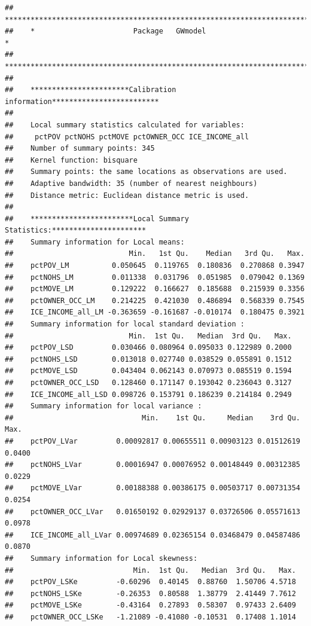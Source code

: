 \documentclass[
]{book}
\begin{document}
\begin{verbatim}
##    ***********************************************************************
##    *                       Package   GWmodel                             *
##    ***********************************************************************
## 
##    ***********************Calibration information*************************
## 
##    Local summary statistics calculated for variables:
##     pctPOV pctNOHS pctMOVE pctOWNER_OCC ICE_INCOME_all
##    Number of summary points: 345
##    Kernel function: bisquare 
##    Summary points: the same locations as observations are used.
##    Adaptive bandwidth: 35 (number of nearest neighbours)
##    Distance metric: Euclidean distance metric is used.
## 
##    ************************Local Summary Statistics:**********************
##    Summary information for Local means:
##                           Min.   1st Qu.    Median   3rd Qu.   Max.
##    pctPOV_LM          0.050645  0.119765  0.180836  0.270868 0.3947
##    pctNOHS_LM         0.011338  0.031796  0.051985  0.079042 0.1369
##    pctMOVE_LM         0.129222  0.166627  0.185688  0.215939 0.3356
##    pctOWNER_OCC_LM    0.214225  0.421030  0.486894  0.568339 0.7545
##    ICE_INCOME_all_LM -0.363659 -0.161687 -0.010174  0.180475 0.3921
##    Summary information for local standard deviation :
##                           Min.  1st Qu.   Median  3rd Qu.   Max.
##    pctPOV_LSD         0.030466 0.080964 0.095033 0.122989 0.2000
##    pctNOHS_LSD        0.013018 0.027740 0.038529 0.055891 0.1512
##    pctMOVE_LSD        0.043404 0.062143 0.070973 0.085519 0.1594
##    pctOWNER_OCC_LSD   0.128460 0.171147 0.193042 0.236043 0.3127
##    ICE_INCOME_all_LSD 0.098726 0.153791 0.186239 0.214184 0.2949
##    Summary information for local variance :
##                              Min.    1st Qu.     Median    3rd Qu.   Max.
##    pctPOV_LVar         0.00092817 0.00655511 0.00903123 0.01512619 0.0400
##    pctNOHS_LVar        0.00016947 0.00076952 0.00148449 0.00312385 0.0229
##    pctMOVE_LVar        0.00188388 0.00386175 0.00503717 0.00731354 0.0254
##    pctOWNER_OCC_LVar   0.01650192 0.02929137 0.03726506 0.05571613 0.0978
##    ICE_INCOME_all_LVar 0.00974689 0.02365154 0.03468479 0.04587486 0.0870
##    Summary information for Local skewness:
##                            Min.  1st Qu.   Median  3rd Qu.   Max.
##    pctPOV_LSKe         -0.60296  0.40145  0.88760  1.50706 4.5718
##    pctNOHS_LSKe        -0.26353  0.80588  1.38779  2.41449 7.7612
##    pctMOVE_LSKe        -0.43164  0.27893  0.58307  0.97433 2.6409
##    pctOWNER_OCC_LSKe   -1.21089 -0.41080 -0.10531  0.17408 1.1014

\end{verbatim}
\end{document}
